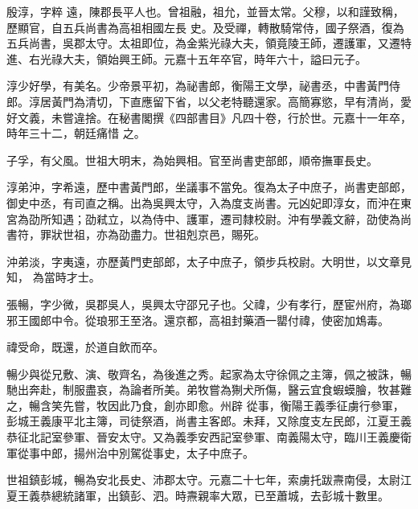
\begin{pinyinscope}

 殷淳，字粹
 遠，陳郡長平人也。曾祖融，祖允，並晉太常。父穆，以和謹致稱，歷顯官，自五兵尚書為高祖相國左長
 史。及受禪，轉散騎常侍，國子祭酒，復為五兵尚書，吳郡太守。太祖即位，為金紫光祿大夫，領竟陵王師，遷護軍，又遷特進、右光祿大夫，領始興王師。元嘉十五年卒官，時年六十，謚曰元子。



 淳少好學，有美名。少帝景平初，為祕書郎，衡陽王文學，祕書丞，中書黃門侍郎。淳居黃門為清切，下直應留下省，以父老特聽還家。高簡寡慾，早有清尚，愛好文義，未嘗違捨。在秘書閣撰《四部書目》凡四十卷，行於世。元嘉十一年卒，時年三十二，朝廷痛惜
 之。



 子孚，有父風。世祖大明末，為始興相。官至尚書吏部郎，順帝撫軍長史。



 淳弟沖，字希遠，歷中書黃門郎，坐議事不當免。復為太子中庶子，尚書吏部郎，御史中丞，有司直之稱。出為吳興太守，入為度支尚書。元凶妃即淳女，而沖在東宮為劭所知遇；劭弒立，以為侍中、護軍，遷司隸校尉。沖有學義文辭，劭使為尚書符，罪狀世祖，亦為劭盡力。世祖剋京邑，賜死。



 沖弟淡，字夷遠，亦歷黃門吏部郎，太子中庶子，領步兵校尉。大明世，以文章見知，
 為當時才士。



 張暢，字少微，吳郡吳人，吳興太守邵兄子也。父禕，少有孝行，歷宦州府，為瑯邪王國郎中令。從琅邪王至洛。還京都，高祖封藥酒一罌付禕，使密加鴆毒。



 禕受命，既還，於道自飲而卒。



 暢少與從兄敷、演、敬齊名，為後進之秀。起家為太守徐佩之主簿，佩之被誅，暢馳出奔赴，制服盡哀，為論者所美。弟牧嘗為猘犬所傷，醫云宜食蝦蟆膾，牧甚難之，暢含笑先嘗，牧因此乃食，創亦即愈。州辟
 從事，衡陽王義季征虜行參軍，彭城王義康平北主簿，司徒祭酒，尚書主客郎。未拜，又除度支左民郎，江夏王義恭征北記室參軍、晉安太守。又為義季安西記室參軍、南義陽太守，臨川王義慶衛軍從事中郎，揚州治中別駕從事史，太子中庶子。



 世祖鎮彭城，暢為安北長史、沛郡太守。元嘉二十七年，索虜托跋燾南侵，太尉江夏王義恭總統諸軍，出鎮彭、泗。時燾親率大眾，已至蕭城，去彭城十數里。




\end{pinyinscope}
